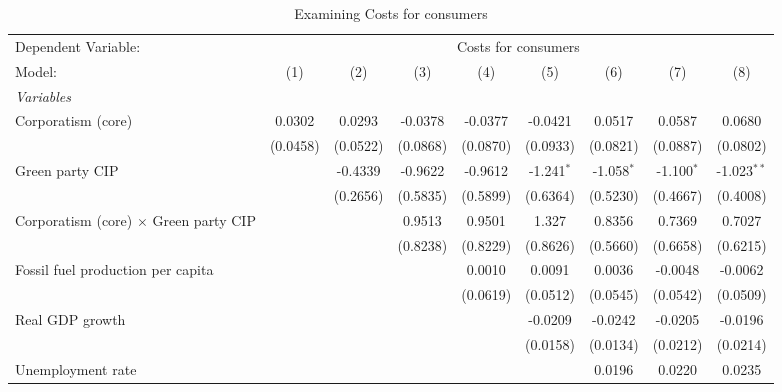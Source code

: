 
\begin{table}[htbp]
   \caption{Examining Costs for consumers}
   \centering
   \begin{tabular}{lcccccccc}
      \tabularnewline \midrule \midrule
      Dependent Variable: & \multicolumn{8}{c}{Costs for consumers}\\
      Model:                                       & (1)      & (2)      & (3)      & (4)      & (5)          & (6)          & (7)          & (8)\\  
      \midrule
      \emph{Variables}\\
      Corporatism (core)                           & 0.0302   & 0.0293   & -0.0378  & -0.0377  & -0.0421      & 0.0517       & 0.0587       & 0.0680\\   
                                                   & (0.0458) & (0.0522) & (0.0868) & (0.0870) & (0.0933)     & (0.0821)     & (0.0887)     & (0.0802)\\   
      Green party CIP                              &          & -0.4339  & -0.9622  & -0.9612  & -1.241$^{*}$ & -1.058$^{*}$ & -1.100$^{*}$ & -1.023$^{**}$\\   
                                                   &          & (0.2656) & (0.5835) & (0.5899) & (0.6364)     & (0.5230)     & (0.4667)     & (0.4008)\\   
      Corporatism (core) $\times$ Green party CIP  &          &          & 0.9513   & 0.9501   & 1.327        & 0.8356       & 0.7369       & 0.7027\\   
                                                   &          &          & (0.8238) & (0.8229) & (0.8626)     & (0.5660)     & (0.6658)     & (0.6215)\\   
      Fossil fuel production per capita            &          &          &          & 0.0010   & 0.0091       & 0.0036       & -0.0048      & -0.0062\\   
                                                   &          &          &          & (0.0619) & (0.0512)     & (0.0545)     & (0.0542)     & (0.0509)\\   
      Real GDP growth                              &          &          &          &          & -0.0209      & -0.0242      & -0.0205      & -0.0196\\   
                                                   &          &          &          &          & (0.0158)     & (0.0134)     & (0.0212)     & (0.0214)\\   
      Unemployment rate                            &          &          &          &          &              & 0.0196       & 0.0220       & 0.0235\\   

\end{tabular}
\end{table}
